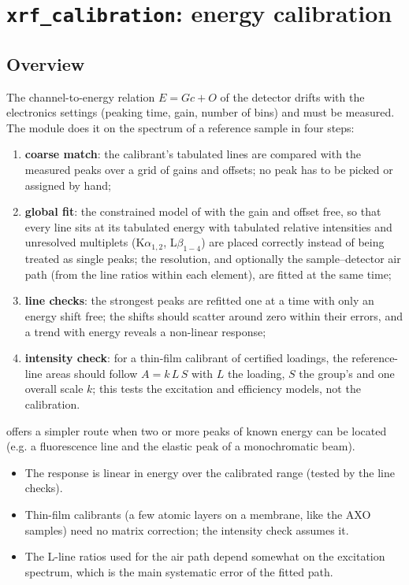 \section{\texttt{xrf\_calibration}: energy calibration}\label{sec:calibration}

\subsection{Overview}

The channel-to-energy relation $E = Gc+O$ of the detector drifts with the electronics
settings (peaking time, gain, number of bins) and must be measured. The module does it on the
spectrum of a reference sample in four steps:
\begin{enumerate}[nosep]
\item \textbf{coarse match}: the calibrant's tabulated lines are compared with the measured
  peaks over a grid of gains and offsets; no peak has to be picked or assigned by hand;
\item \textbf{global fit}: the constrained model of  with the gain and offset
  free, so that every line sits at its tabulated energy with tabulated relative intensities
  and unresolved multiplets (K$\alpha_{1,2}$, L$\beta_{1-4}$) are placed correctly instead of
  being treated as single peaks; the resolution, and optionally the sample--detector air path
  (from the line ratios within each element), are fitted at the same time;
\item \textbf{line checks}: the strongest peaks are refitted one at a time with only an
  energy shift free; the shifts should scatter around zero within their errors, and a trend
  with energy reveals a non-linear response;
\item \textbf{intensity check}: for a thin-film calibrant of certified loadings, the
  reference-line areas should follow $A = k\,L\,S$ with $L$ the loading, $S$ the group's
   and one overall scale $k$; this tests the excitation and efficiency
  models, not the calibration.
\end{enumerate}
 offers a simpler route when two or more peaks of known energy
can be located (e.g. a fluorescence line and the elastic peak of a monochromatic beam).

\begin{hyp}
\begin{itemize}[nosep,leftmargin=1em]
\item The response is linear in energy over the calibrated range (tested by the line
  checks).
\item Thin-film calibrants (a few atomic layers on a membrane, like the AXO samples) need no
  matrix correction; the intensity check assumes it.
\item The L-line ratios used for the air path depend somewhat on the excitation spectrum,
  which is the main systematic error of the fitted path.
\end{itemize}
\end{hyp}

